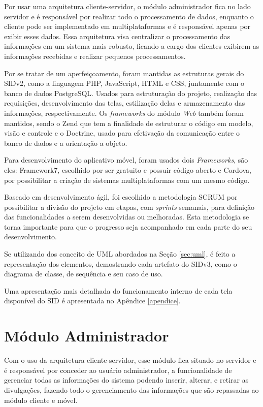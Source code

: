 Por usar uma arquitetura cliente-servidor, o módulo administrador fica no lado servidor e é responsável por realizar todo o processamento de dados, enquanto o cliente pode ser implementado em multiplataformas e é responsável apenas por exibir esses dados. Essa arquitetura visa centralizar o processamento das informações em um sistema mais robusto, ficando a cargo dos clientes exibirem as informações recebidas e realizar pequenos processamentos. 

Por se tratar de um aperfeiçoamento, foram mantidas as estruturas gerais do SIDv2, como a linguagem PHP, JavaScript, HTML e CSS, juntamente com o banco de dados PostgreSQL. Usados para estruturação do projeto, realização das requisições, desenvolvimento das telas, estilização delas e armazenamento das informações, respectivamente. Os \textit{frameworks} do módulo \textit{Web} também foram mantidos, sendo o Zend que tem a finalidade de estruturar o código em modelo, visão e controle e o Doctrine, usado para efetivação da comunicação entre o banco de dados e a orientação a objeto.

Para desenvolvimento do aplicativo móvel, foram usados dois \textit{Frameworks}, são eles: Framework7, escolhido por ser gratuito e possuir código aberto e Cordova, por possibilitar a criação de sistemas multiplataformas com um mesmo código.

Baseado em desenvolvimento ágil, foi escolhido a metodologia SCRUM por possibilitar a divisão do projeto em etapas, com \textit{sprints} semanais, para definição das funcionalidades a serem desenvolvidas ou melhoradas. Esta metodologia se torna importante para que o progresso seja acompanhado em cada parte do seu desenvolvimento.

Se utilizando dos conceito de UML abordados na Seção \ref{sec:uml}, é  feito a representação dos elementos, demostrando cada artefato do SIDv3, como o diagrama de classe, de sequência e seu caso de uso.

Uma apresentação mais detalhada do funcionamento interno de cada tela disponível do SID é apresentada no Apêndice \ref{apendice}.

\section{Módulo Administrador}
Com o uso da arquitetura cliente-servidor, esse módulo fica situado no servidor e é responsável por conceder ao usuário administrador, a funcionalidade de gerenciar todas as informações do sistema podendo inserir, alterar, e retirar as divulgações, fazendo todo o gerenciamento das informações que são repassadas ao módulo cliente e móvel.

